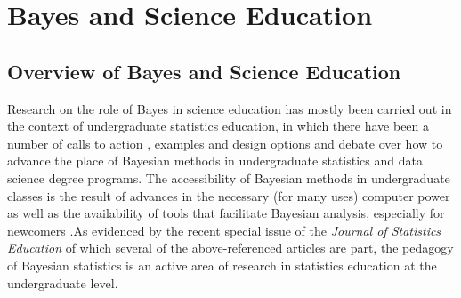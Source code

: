 \documentclass[man]{apa7}
\begin{document}

\section{Bayes and Science Education}

\subsection{Overview of Bayes and Science Education}

Research on the role of Bayes in science education has mostly been carried out in the context of undergraduate statistics education, in which there have been a number of calls to action \parencite{gpkpwc18, h_a20}, examples and design options \parencite{a02, b02,g08, w17, h_j} and debate \parencite{jrhrr20} over how to advance the place of Bayesian methods in undergraduate statistics and data science degree programs. The accessibility of Bayesian methods in undergraduate classes is the result of advances in the necessary (for many uses) computer power \parencite{gpkpwc18} as well as the availability of tools that facilitate Bayesian analysis, especially for newcomers \parencite{ah20} .As evidenced by the recent special issue of the \emph{Journal of Statistics Education} of which several of the above-referenced articles are part, the pedagogy of Bayesian statistics is an active area of research in statistics education at the undergraduate level.
\end{document}
